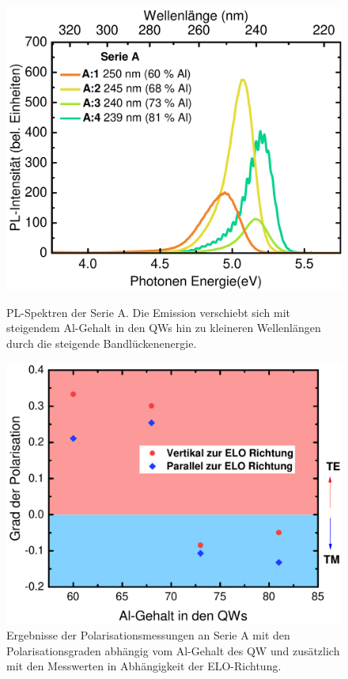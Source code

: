 \begin{figure}[htb]
  \centering
  \begin{minipage}[t]{0.49\textwidth}
    \centering
    \includegraphics[width=\textwidth]{Bilder/spektrenAlvariation.pdf}
    \caption{PL-Spektren der Serie A. Die Emission verschiebt sich mit steigendem Al-Gehalt in den QWs hin zu kleineren Wellenl\"angen durch die steigende Bandl\"uckenenergie. }
    \label{fig:alvariationSpektrum}
  \end{minipage}
	\hfill
  \begin{minipage}[t]{0.49\textwidth}
    \centering
    \includegraphics[width=\linewidth]{Bilder/polarisationAlvariation.pdf}
    \caption{Ergebnisse der Polarisationsmessungen an Serie A mit den Polarisationsgraden abh\"angig vom Al-Gehalt des QW und zus\"atzlich mit den Messwerten in Abh\"angigkeit der ELO-Richtung. }
    \label{fig:alvariationPolarisation}
  \end{minipage}
\end{figure}
